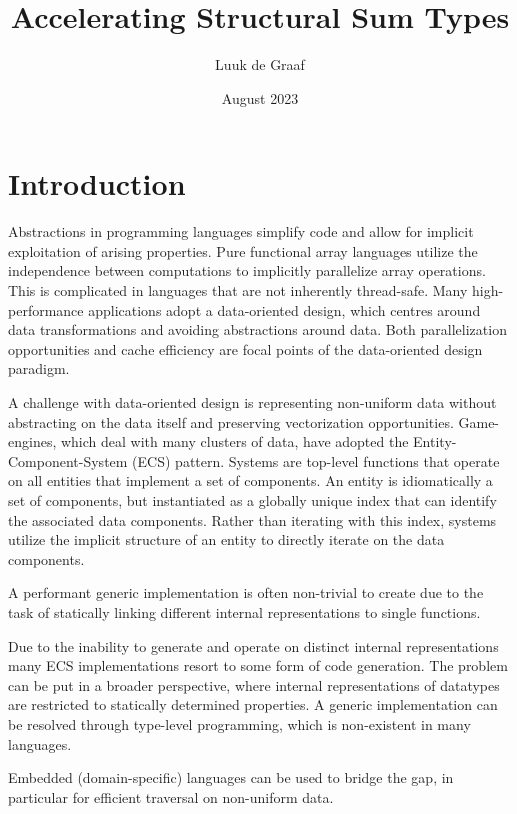 \documentclass{article}
\title{Accelerating Structural Sum Types}
\author{Luuk de Graaf}
\date{August 2023}
\begin{document}
\maketitle

\tableofcontents

\newpage

\section{Introduction}

Abstractions in programming languages simplify code and allow for implicit exploitation of arising properties.
Pure functional array languages utilize the independence between computations to implicitly parallelize array operations.
This is complicated in languages that are not inherently thread-safe.
Many high-performance applications adopt a data-oriented design, which centres around data transformations and avoiding abstractions around data. 
Both parallelization opportunities and cache efficiency are focal points of the data-oriented design paradigm.

A challenge with data-oriented design is representing non-uniform data without abstracting on the data itself and preserving vectorization opportunities. 
Game-engines, which deal with many clusters of data, have adopted the Entity-Component-System (ECS) pattern. 
Systems are top-level functions that operate on all entities that implement a set of components. 
An entity is idiomatically a set of components, but instantiated as a globally unique index that can identify the associated data components.
Rather than iterating with this index, systems utilize the implicit structure of an entity to directly iterate on the data components. 

A performant generic implementation is often non-trivial to create due to the task of statically linking different internal representations to single functions.


Due to the inability to generate and operate on distinct internal representations many ECS implementations resort to some form of code generation. 
The problem can be put in a broader perspective, where internal representations of datatypes are restricted to statically determined properties.
A generic implementation can be resolved through type-level programming, which is non-existent in many languages.

Embedded (domain-specific) languages can be used to bridge the gap, in particular for efficient traversal on non-uniform data.
\end{document}
